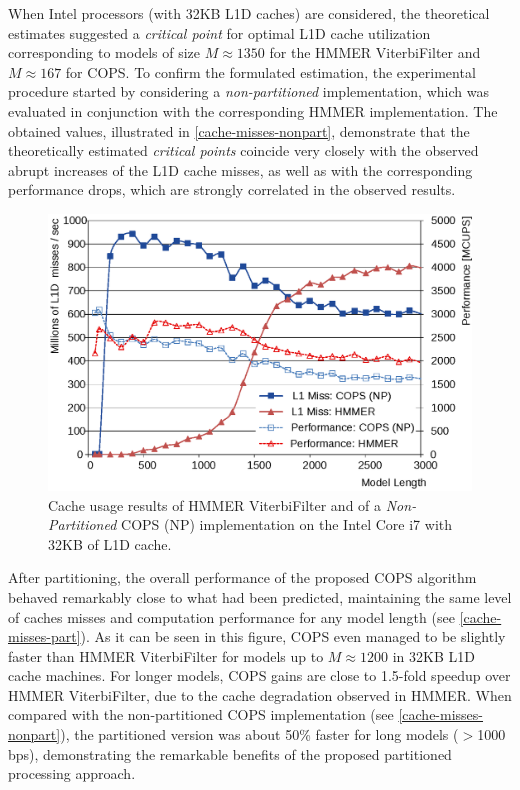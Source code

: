 \documentclass{bmcart}
\def\texttt{[image: ]}
\begin{document}
When Intel processors (with 32KB \ac{L1D} caches) are considered, the theoretical estimates suggested a \emph{critical point} for optimal \ac{L1D} cache utilization corresponding to models of size $M{\approx}1350$ for the HMMER ViterbiFilter and $M{\approx}167$ for \ac{COPS}.
To confirm the formulated estimation, the experimental procedure started by considering a \textit{non-partitioned} implementation, which was evaluated in conjunction with the corresponding HMMER implementation. The obtained values, illustrated in \autoref{cache-misses-nonpart}, demonstrate that the theoretically estimated \emph{critical points} coincide very closely with the observed abrupt increases of the \ac{L1D} cache misses, as well as with the corresponding performance drops, which are strongly correlated in the observed results.

\begin{figure}[!b]
  \centering
  \includegraphics{img/cacheNp.eps} 
  \caption{Cache usage results of HMMER ViterbiFilter and of a \textit{Non-Partitioned} COPS (NP) implementation on the Intel Core i7 with 32KB of L1D cache.}
  \label{cache-misses-nonpart}
\end{figure}

After partitioning, the overall performance of the proposed \ac{COPS} algorithm behaved remarkably close to what had been predicted, maintaining the same level of caches misses and computation performance for any model length (see \autoref{cache-misses-part}). As it can be seen in this figure, \ac{COPS} even managed to be slightly faster than HMMER ViterbiFilter for models up to $M{\approx}1200$ in 32KB L1D cache machines. For longer models, \ac{COPS} gains are close to 1.5-fold speedup over HMMER ViterbiFilter, due to the cache degradation observed in HMMER. When compared with the non-partitioned \ac{COPS} implementation (see \autoref{cache-misses-nonpart}), the partitioned version was about 50\% faster for long models ($>$1000 bps), demonstrating the remarkable benefits of the proposed partitioned processing approach.
\end{document}
